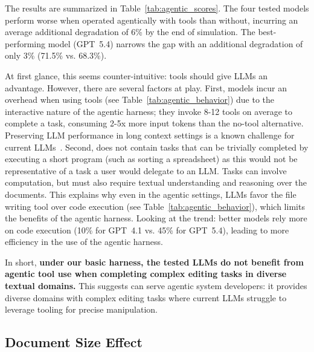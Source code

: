 \documentclass{article} %
\begin{document}
The results are summarized in Table~\ref{tab:agentic_scores}. The four tested models perform worse when operated agentically with tools than without, incurring an average additional degradation of 6\% by the end of simulation. The best-performing model (GPT~5.4) narrows the gap with an additional degradation of only 3\% (71.5\% vs. 68.3\%).

At first glance, this seems counter-intuitive: tools should give LLMs an advantage. However, there are several factors at play. First, models incur an overhead when using tools (see Table~\ref{tab:agentic_behavior}) due to the interactive nature of the agentic harness; they invoke 8-12 tools on average to complete a task, consuming 2-5x more input tokens than the no-tool alternative. Preserving LLM performance in long context settings is a known challenge for current LLMs~\citep{Liu2023LostIT, Laban2024SummaryOA}. Second, \benchmark{} does not contain tasks that can be trivially completed by executing a short program (such as sorting a spreadsheet) as this would not be representative of a task a user would delegate to an LLM. Tasks can involve computation, but must also require textual understanding and reasoning over the documents. This explains why even in the agentic settings, LLMs favor the file writing tool over code execution (see Table~\ref{tab:agentic_behavior}), which limits the benefits of the agentic harness. Looking at the trend: better models rely more on code execution (10\% for GPT~4.1 vs. 45\% for GPT~5.4), leading to more efficiency in the use of the agentic harness.

In short, \textbf{under our basic harness, the tested LLMs do not benefit from agentic tool use when completing complex editing tasks in diverse textual domains.} This suggests \benchmark{} can serve agentic system developers: it provides diverse domains with complex editing tasks where current LLMs struggle to leverage tooling for precise manipulation.

\subsection{Document Size Effect} \label{sec:context_size}
\end{document}
